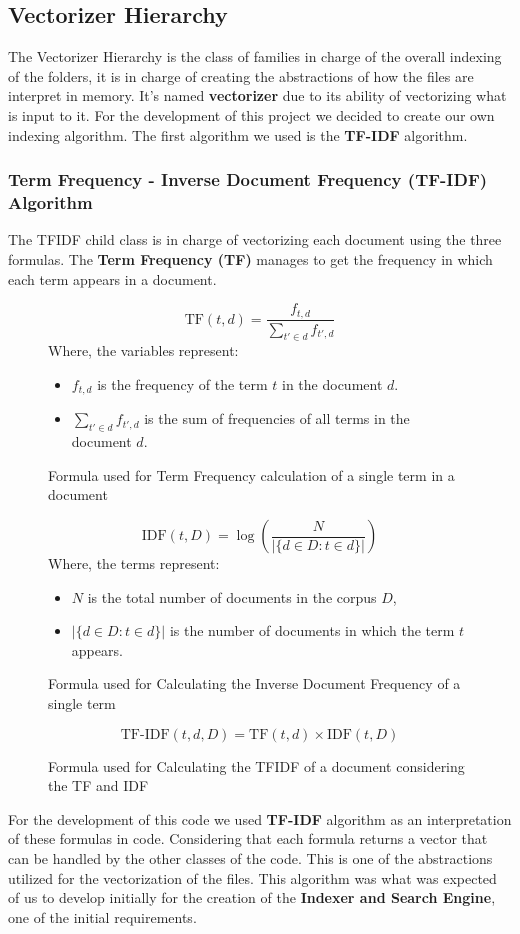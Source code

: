 \documentclass{article}
\begin{document}
\subsection{Vectorizer Hierarchy}
The Vectorizer Hierarchy is the class of families in charge of the overall indexing of the folders, it is in charge of creating the abstractions of how the files are interpret in memory. It's named \textbf{vectorizer} due to its ability of vectorizing what is input to it. For the development of this project we decided to create our own indexing algorithm. The first algorithm we used is the \textbf{TF-IDF} algorithm.
\subsubsection{Term Frequency - Inverse Document Frequency (TF-IDF) Algorithm}
The TFIDF child class is in charge of vectorizing each document using the three formulas. The \textbf{Term Frequency (TF)} manages to get the frequency in which each term appears in a document. 
\begin{figure}[H]
    \[
    \text{TF}(t, d) = \frac{f_{t,d}}{\sum_{t' \in d} f_{t',d}}
    \]
    Where, the variables represent:
    \begin{itemize}
        \item \( f_{t,d} \) is the frequency of the term \( t \) in the document \( d \).
        \item \( \sum_{t' \in d} f_{t',d} \) is the sum of frequencies of all terms in the document \( d \).
    \end{itemize}
    \caption{Formula used for Term Frequency calculation of a single term in a document}
    \label{fig:TermFrequency}
\end{figure}
\begin{figure}[H]
    \[
    \text{IDF}(t, D) = \log\left(\frac{N}{| \{ d \in D : t \in d \} |}\right)
    \]
    Where, the terms represent:
    \begin{itemize}
        \item \( N \) is the total number of documents in the corpus \( D \),
        \item \( | \{ d \in D : t \in d \} | \) is the number of documents in which the term \( t \) appears.
    \end{itemize}
    \caption{Formula used for Calculating the Inverse Document Frequency of a single term}
    \label{fig:InverseDocumentFrequency}
\end{figure}
\begin{figure}[H]
    \[
    \text{TF-IDF}(t, d, D) = \text{TF}(t, d) \times \text{IDF}(t, D)
    \]
    \caption{Formula used for Calculating the TFIDF of a document considering the TF and IDF}
    \label{fig:TFIDF}
\end{figure}
For the development of this code we used \textbf{TF-IDF} algorithm as an interpretation of these formulas in code. Considering that each formula returns a vector that can be handled by the other classes of the code. This is one of the abstractions utilized for the vectorization of the files.
\newline
\indent This algorithm was what was expected of us to develop initially for the creation of the \textbf{Indexer and Search Engine}, one of the initial requirements.
\end{document}
